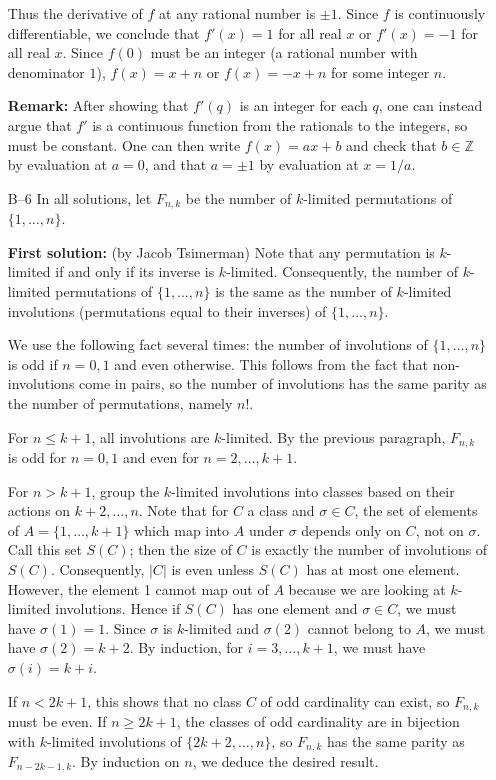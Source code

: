 \documentclass[amssymb,twocolumn,pra,10pt,aps]{revtex4-1}
\newcommand{\ZZ}{\mathbb{Z}}
\begin{document}
\begin{itemize}
Thus the derivative of $f$ at any rational number is $\pm 1$. Since $f$ is continuously differentiable, we conclude that $f'(x) = 1$ for all real $x$ or $f'(x) = -1$ for all real $x$. Since $f(0)$ must be an integer (a rational number with denominator $1$), $f(x)=x+n$ or $f(x)=-x+n$ for some integer $n$.

\textbf{Remark:}
After showing that $f'(q)$ is an integer for each $q$, one can instead
argue that $f'$ is a continuous function from the rationals to the integers,
so must be constant. One can then write $f(x) = ax+b$ and check that
$b \in \ZZ$ by evaluation at $a=0$, and that $a= \pm 1$ by evaluation at
$x=1/a$.

\item[B--6]
In all solutions,
let $F_{n,k}$ be the number of $k$-limited permutations of
$\{1,\dots,n\}$.

\textbf{First solution:}
(by Jacob Tsimerman)
Note that any permutation is $k$-limited if and only if its inverse is
$k$-limited. Consequently, the number of $k$-limited permutations of
$\{1,\dots,n\}$ is the same as the number of $k$-limited involutions
(permutations equal to their inverses) of $\{1,\dots,n\}$.

We use the following fact several times: the number of involutions
of $\{1,\dots,n\}$ is odd if $n=0,1$ and even otherwise. This follows from
the fact that non-involutions come in pairs, so the number of involutions
has the same parity as the number of permutations, namely $n!$.

For $n \leq k+1$, all involutions are $k$-limited.
By the previous paragraph, $F_{n,k}$ is odd for $n=0,1$ and even for
$n=2,\dots,k+1$.

For $n > k+1$, group the  $k$-limited involutions into classes based on
their actions on $k+2,\dots,n$. Note that for $C$ a class and $\sigma \in C$,
the set of elements of $A = \{1,\dots,k+1\}$ which map into $A$ under
$\sigma$ depends only on $C$, not on $\sigma$. Call this set $S(C)$; then
the size of $C$ is exactly the number of involutions of $S(C)$.
Consequently, $|C|$ is even unless $S(C)$ has at most one element.
However, the element 1 cannot map out of $A$ because we are looking at
$k$-limited involutions. Hence if $S(C)$ has one element and $\sigma \in C$,
we must have $\sigma(1) = 1$. Since $\sigma$ is $k$-limited and
$\sigma(2)$ cannot belong to $A$, we must have $\sigma(2) = k+2$. By
induction, for $i=3,\dots,k+1$, we must have  $\sigma(i) = k+i$.

If $n < 2k+1$, this shows that no class $C$ of odd cardinality can exist,
so $F_{n,k}$ must be even. If $n \geq 2k+1$, the classes of odd cardinality
are in bijection with $k$-limited involutions of $\{2k+2,\dots,n\}$,
so $F_{n,k}$ has the same parity as $F_{n-2k-1,k}$. By induction on $n$,
we deduce the desired result.


\end{itemize}
\end{document}
